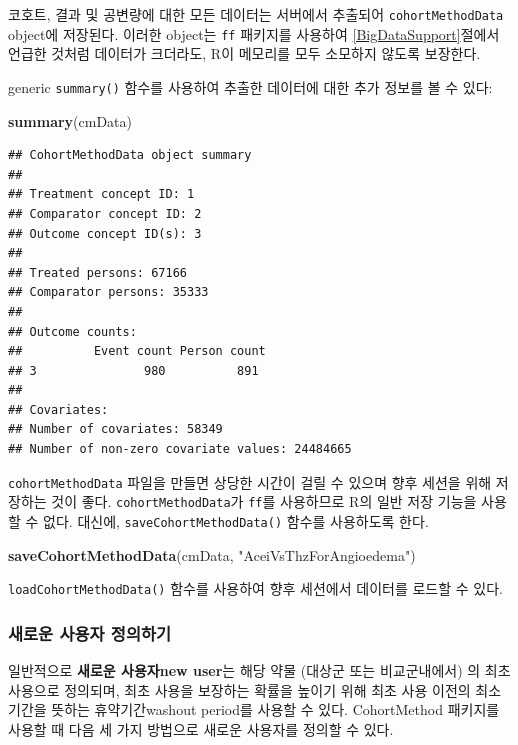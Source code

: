 \documentclass[10.5pt]{book}
\newenvironment{Shaded}{\begin{snugshade}}{\end{snugshade}}
\newcommand{\KeywordTok}[1]{\textcolor[rgb]{0.13,0.29,0.53}{\textbf{#1}}}
\newcommand{\StringTok}[1]{\textcolor[rgb]{0.31,0.60,0.02}{#1}}
\newcommand{\NormalTok}[1]{#1}
\theoremstyle{definition}
\theoremstyle{definition}
\theoremstyle{definition}
\theoremstyle{remark}
\begin{document}
코호트, 결과 및 공변량에 대한 모든 데이터는 서버에서 추출되어
\texttt{cohortMethodData} object에 저장된다. 이러한 object는 \texttt{ff}
패키지를 사용하여 \ref{BigDataSupport}절에서 언급한 것처럼 데이터가
크더라도, R이 메모리를 모두 소모하지 않도록 보장한다.

generic \texttt{summary()} 함수를 사용하여 추출한 데이터에 대한 추가
정보를 볼 수 있다:

\begin{Shaded}
\begin{Highlighting}[]
\KeywordTok{summary}\NormalTok{(cmData)}
\end{Highlighting}
\end{Shaded}

\begin{verbatim}
## CohortMethodData object summary
## 
## Treatment concept ID: 1
## Comparator concept ID: 2
## Outcome concept ID(s): 3
## 
## Treated persons: 67166
## Comparator persons: 35333
## 
## Outcome counts:
##          Event count Person count
## 3               980          891
## 
## Covariates:
## Number of covariates: 58349
## Number of non-zero covariate values: 24484665
\end{verbatim}

\texttt{cohortMethodData} 파일을 만들면 상당한 시간이 걸릴 수 있으며
향후 세션을 위해 저장하는 것이 좋다. \texttt{cohortMethodData}가
\texttt{ff}를 사용하므로 R의 일반 저장 기능을 사용할 수 없다. 대신에,
\texttt{saveCohortMethodData()} 함수를 사용하도록 한다.

\begin{Shaded}
\begin{Highlighting}[]
\KeywordTok{saveCohortMethodData}\NormalTok{(cmData, }\StringTok{"AceiVsThzForAngioedema"}\NormalTok{)}
\end{Highlighting}
\end{Shaded}

\texttt{loadCohortMethodData()} 함수를 사용하여 향후 세션에서 데이터를
로드할 수 있다.

\subsubsection*{새로운 사용자 정의하기}\label{--}

일반적으로 \textbf{새로운 사용자new user}는 해당 약물 (대상군 또는
비교군내에서) 의 최초 사용으로 정의되며, 최초 사용을 보장하는 확률을
높이기 위해 최초 사용 이전의 최소 기간을 뜻하는 휴약기간washout period를
사용할 수 있다. CohortMethod 패키지를 사용할 때 다음 세 가지 방법으로
새로운 사용자를 정의할 수 있다.
\end{document}
